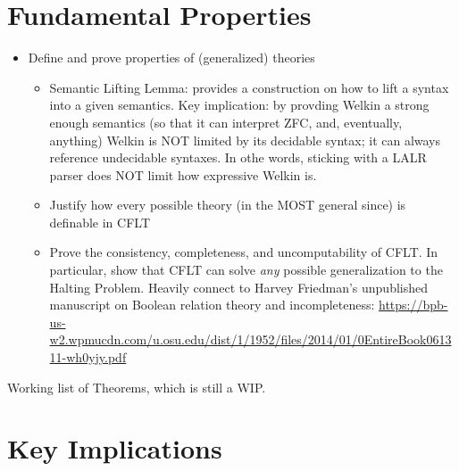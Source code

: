 \section{Fundamental Properties}
\begin{itemize}
  \item Define and prove properties of (generalized) theories
  \begin{itemize}
    \item Semantic Lifting Lemma: provides a construction on how to lift a syntax into a given semantics. Key implication: by provding Welkin a strong enough semantics (so that it can interpret ZFC, and, eventually, anything) Welkin is NOT limited by its decidable syntax; it can always reference undecidable syntaxes. In othe words, sticking with a LALR parser does NOT limit how expressive Welkin is.
    \item Justify how every possible theory (in the MOST general since) is definable in CFLT
    \item Prove the consistency, completeness, and uncomputability of CFLT. In particular, show that CFLT can solve \textit{any} possible generalization to the Halting Problem. Heavily connect to Harvey Friedman's unpublished manuscript on Boolean relation theory and incompleteness: \url{https://bpb-us-w2.wpmucdn.com/u.osu.edu/dist/1/1952/files/2014/01/0EntireBook061311-wh0yjy.pdf} \end{itemize}
\end{itemize}

Working list of Theorems, which is still a WIP.
\begin{theorem}

\end{theorem}

\section{Key Implications}
